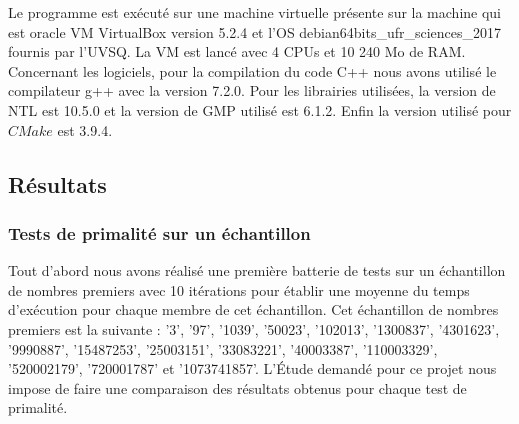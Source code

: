 Le programme est exécuté sur une machine virtuelle présente sur la machine qui est oracle VM VirtualBox version 5.2.4 et l'OS debian64bits\_ufr\_sciences\_2017 fournis par l'UVSQ. La VM est lancé avec 4 CPUs et 10 240 Mo de RAM.\\
		Concernant les logiciels, pour la compilation du code C++ nous avons utilisé le compilateur g++ avec la version 7.2.0. Pour les librairies utilisées, la version de NTL est 10.5.0 et la version de GMP utilisé est 6.1.2. Enfin la version utilisé pour $CMake$ est 3.9.4.
			
		\subsection{Résultats} 		
		\subsubsection{Tests de primalité sur un échantillon}
	Tout d'abord nous avons réalisé une première batterie de tests sur un échantillon de nombres premiers avec 10 itérations pour établir une moyenne du temps d'exécution pour chaque membre de cet échantillon. Cet échantillon de nombres premiers est la suivante : '3', '97', '1039', '50023', '102013', '1300837', '4301623', '9990887', '15487253', '25003151', '33083221', '40003387', '110003329', '520002179', '720001787' et '1073741857'. L’Étude demandé pour ce projet nous impose de faire une comparaison des résultats obtenus pour chaque test de primalité.\\
	
